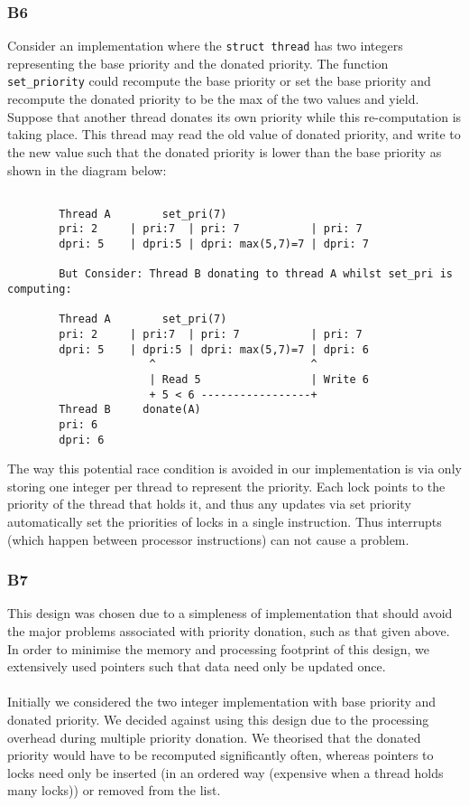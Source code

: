 \documentclass[a4wide, 11pt]{article}
\newcommand{\tx}{\texttt}
\begin{document}
\subsubsection{B6}
Consider an implementation where the \tx{struct thread} has two integers representing the base priority and the donated priority. The function \tx{set\_priority} could recompute the base priority or set the base priority and recompute the donated priority to be the max of the two values and yield. Suppose that another thread donates its own priority while this re-computation is taking place. This thread may read the old value of donated priority, and write to the new value such that the donated priority is lower than the base priority as shown in the diagram below:
\begin{verbatim}

        Thread A        set_pri(7)
        pri: 2     | pri:7  | pri: 7           | pri: 7
        dpri: 5    | dpri:5 | dpri: max(5,7)=7 | dpri: 7

        But Consider: Thread B donating to thread A whilst set_pri is computing: 

        Thread A        set_pri(7)
        pri: 2     | pri:7  | pri: 7           | pri: 7
        dpri: 5    | dpri:5 | dpri: max(5,7)=7 | dpri: 6
                      ^                        ^
                      | Read 5                 | Write 6
                      + 5 < 6 -----------------+
        Thread B     donate(A)
        pri: 6
        dpri: 6 
\end{verbatim}    

The way this potential race condition is avoided in our implementation is via only storing one integer per thread to represent the priority. Each lock points to the priority of the thread that holds it, and thus any updates via set priority automatically set the priorities of locks in a single instruction. Thus interrupts (which happen between processor instructions) can not cause a problem.

\subsubsection{B7} 

This design was chosen due to a simpleness of implementation that should avoid 
the major problems associated with priority donation, such as that given above. 
In order to minimise the memory and processing footprint of this design, we 
extensively used pointers such that data need only be updated once. 
\\\\
Initially we considered the two integer implementation with base priority and 
donated priority. We decided against using this design due to the processing 
overhead during multiple priority donation. We theorised that the donated 
priority would have to be recomputed significantly often, whereas pointers to 
locks need only be inserted (in an ordered way (expensive when a thread holds 
many locks)) or removed from the list. 
\end{document}
